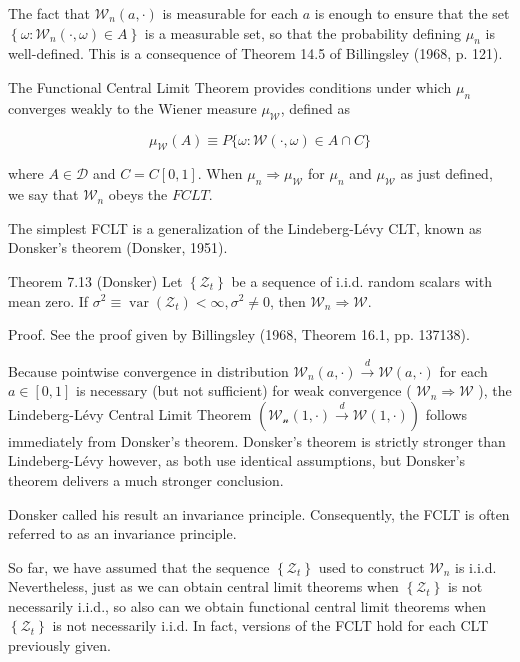 \documentclass[10pt]{article}
\begin{document}
The fact that $\mathcal{W}_{n}(a, \cdot)$ is measurable for each $a$ is enough to ensure that the set $\left\{\omega: \mathcal{W}_{n}(\cdot, \omega) \in A\right\}$ is a measurable set, so that the probability defining $\mu_{n}$ is well-defined. This is a consequence of Theorem 14.5 of Billingsley (1968, p. 121).

The Functional Central Limit Theorem provides conditions under which $\mu_{n}$ converges weakly to the Wiener measure $\mu_{\mathcal{W}}$, defined as

$$
\mu_{\mathcal{W}}(A) \equiv P\{\omega: \mathcal{W}(\cdot, \omega) \in A \cap C\}
$$

where $A \in \mathcal{D}$ and $C=C[0,1]$. When $\mu_{n} \Rightarrow \mu_{\mathcal{W}}$ for $\mu_{n}$ and $\mu_{\mathcal{W}}$ as just defined, we say that $\mathcal{W}_{n}$ obeys the $F C L T$.

The simplest FCLT is a generalization of the Lindeberg-Lévy CLT, known as Donsker's theorem (Donsker, 1951).

Theorem 7.13 (Donsker) Let $\left\{\mathcal{Z}_{t}\right\}$ be a sequence of i.i.d. random scalars with mean zero. If $\sigma^{2} \equiv \operatorname{var}\left(\mathcal{Z}_{t}\right)<\infty, \sigma^{2} \neq 0$, then $\mathcal{W}_{n} \Rightarrow \mathcal{W}$.

Proof. See the proof given by Billingsley (1968, Theorem 16.1, pp. 137138).

Because pointwise convergence in distribution $\mathcal{W}_{n}(a, \cdot) \xrightarrow{d} \mathcal{W}(a, \cdot)$ for each $a \in[0,1]$ is necessary (but not sufficient) for weak convergence ( $\mathcal{W}_{n} \Rightarrow \mathcal{W}$ ), the Lindeberg-Lévy Central Limit Theorem $\left(\mathcal{\mathcal { W } _ { n }}(1, \cdot) \xrightarrow{d} \mathcal{W}(1, \cdot)\right)$ follows immediately from Donsker's theorem. Donsker's theorem is strictly stronger than Lindeberg-Lévy however, as both use identical assumptions, but Donsker's theorem delivers a much stronger conclusion.

Donsker called his result an invariance principle. Consequently, the FCLT is often referred to as an invariance principle.

So far, we have assumed that the sequence $\left\{\mathcal{Z}_{t}\right\}$ used to construct $\mathcal{W}_{n}$ is i.i.d. Nevertheless, just as we can obtain central limit theorems when $\left\{\mathcal{Z}_{t}\right\}$ is not necessarily i.i.d., so also can we obtain functional central limit theorems when $\left\{\mathcal{Z}_{t}\right\}$ is not necessarily i.i.d. In fact, versions of the FCLT hold for each CLT previously given.
\end{document}
